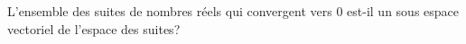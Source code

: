 L'ensemble des suites de nombres r{\'e}els qui convergent vers 0 est-il un sous espace vectoriel de l'espace des suites?
\bigskip